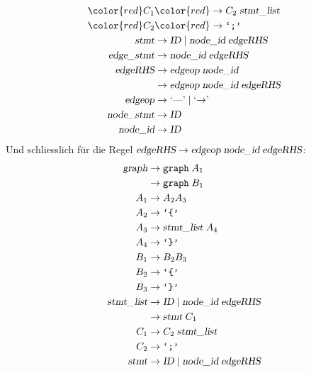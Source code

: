 \begin{loesung}
\begin{teilaufgaben}
\begin{align*}
\color{red}C_1     &\color{red}\rightarrow C_2\;\textsl{stmt\_list}\\
\color{red}C_2     &\color{red}\rightarrow \texttt{`;'} \\
\textsl{stmt}      &\rightarrow \textsl{ID}\; |\;
                                \textsl{node\_id}\; \textsl{edgeRHS} \\
\textsl{edge\_stmt}&\rightarrow \textsl{node\_id}\; \textsl{edgeRHS} \\
\textsl{edgeRHS}   &\rightarrow \textsl{edgeop}\; \textsl{node\_id}\\
                   &\rightarrow \textsl{edgeop}\; \textsl{node\_id}\; \textsl{edgeRHS}\\
\textsl{edgeop}    &\rightarrow \textrm{`\text{---}'}\; |\; \textrm{`$\rightarrow$'}\; \\
\textsl{node\_stmt}&\rightarrow \textsl{ID} \\
\textsl{node\_id}  &\rightarrow \textsl{ID}
\end{align*}
Und schliesslich für die Regel 
$\textsl{edgeRHS}   \rightarrow \textsl{edgeop}\; \textsl{node\_id}\; \textsl{edgeRHS}$:
\begin{align*}
\textsl{graph}     &\rightarrow \texttt{graph}\; A_1 \\
                   &\rightarrow \texttt{graph}\; B_1 \\
A_1                &\rightarrow A_2A_3\\
A_2                &\rightarrow \texttt{`\{'}\\
A_3                &\rightarrow \textsl{stmt\_list}\;A_4\\
A_4                &\rightarrow \texttt{`\}'}\\
B_1                &\rightarrow B_2B_3\\
B_2                &\rightarrow \texttt{`\{'}\\
B_3                &\rightarrow \texttt{`\}'}\\
\textsl{stmt\_list}&\rightarrow \textsl{ID}\; |\;
                                \textsl{node\_id}\; \textsl{edgeRHS} \\
                   &\rightarrow \textsl{stmt}\; C_1\\
C_1                &\rightarrow C_2\;\textsl{stmt\_list}\\
C_2                &\rightarrow \texttt{`;'} \\
\textsl{stmt}      &\rightarrow \textsl{ID}\; |\;
                                \textsl{node\_id}\; \textsl{edgeRHS} \\

\end{align*}
\end{teilaufgaben}
\end{loesung}
